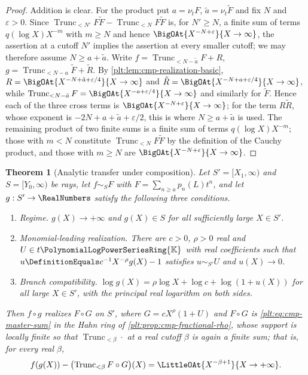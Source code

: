 \documentclass[11pt,oneside]{article}
\theoremstyle{plain}
\newtheorem{theorem}{Theorem}[section]
\theoremstyle{definition}
\theoremstyle{remark}
\newcommand{\K}{\mathbb{K}}
\newcommand{\PLpow}{\PolynomialLogPowerSeriesRing{\K}}   %
\newcommand{\ordt}{\nu_{t}}                              %
\newcommand{\Trunc}[2]{\operatorname{Trunc}_{<#2}#1}     %
\newcommand{\compose}{\mathbin{\circ}}
\begin{document}
\begin{proof}
Addition is clear.  For the product put \(a=\ordt F\),
\(\tilde a=\ordt\tilde F\) and fix \(N\) and \(\varepsilon>0\).
Since \(\Trunc{F\tilde F}{N'}-\Trunc{F\tilde F}{N}\) is, for \(N'\ge N\), a
finite sum of terms \(q(\log X)X^{-m}\) with \(m\ge N\) and hence
\(\BigOAt{X^{-N+\varepsilon}}{X\to\infty}\), the assertion at a cutoff \(N'\)
implies the assertion at every smaller cutoff; we may therefore assume
\(N\ge a+\tilde a\).  Write
\(f=\Trunc{F}{N-\tilde a}+R\), \(g=\Trunc{\tilde F}{N-a}+\tilde R\).  By
\cref{plt:lem:cmp-realization-basic},
\(R=\BigOAt{X^{-N+\tilde a+\varepsilon/4}}{X\to\infty}\) and
\(\tilde R=\BigOAt{X^{-N+a+\varepsilon/4}}{X\to\infty}\), while
\(\Trunc{F}{N-\tilde a}=\BigOAt{X^{-a+\varepsilon/4}}{X\to\infty}\) and
similarly for \(\tilde F\).  Hence each of the three cross terms is
\(\BigOAt{X^{-N+\varepsilon}}{X\to\infty}\); for the term \(R\tilde R\),
whose exponent is \(-2N+a+\tilde a+\varepsilon/2\), this is where
\(N\ge a+\tilde a\) is used.  The remaining product of two
finite sums is a finite sum of terms \(q(\log X)X^{-m}\); those with \(m<N\)
constitute \(\Trunc{F\tilde F}{N}\) by the definition of the Cauchy product,
and those with \(m\ge N\) are \(\BigOAt{X^{-N+\varepsilon}}{X\to\infty}\).
\end{proof}

\begin{theorem}[Analytic transfer under composition]
\label{plt:thm:cmp-analytic-transfer}
Let \(S'=[X_{1},\infty)\) and \(S=[Y_{0},\infty)\) be rays, let
\(f\sim_{S}F\) with \(F=\sum_{n\ge a}p_n(L)t^n\), and let
\(g:S'\to\RealNumbers\) satisfy the following three conditions.
\begin{enumerate}
\item[\textup{(A1)}] \emph{Regime.}  \(g(X)\to+\infty\) and
\(g(X)\in S\) for all sufficiently large \(X\in S'\).
\item[\textup{(A2)}] \emph{Monomial-leading realization.}  There are
\(c>0\), \(\rho>0\) real and \(U\in t\PLpow\) with real coefficients such
that \(u\DefinitionEquals c^{-1}X^{-\rho}g(X)-1\) satisfies
\(u\sim_{S'}U\) and \(u(X)\to0\).
\item[\textup{(A3)}] \emph{Branch compatibility.}
\(\log g(X)=\rho\log X+\log c+\log(1+u(X))\) for all large \(X\in S'\), with
the principal real logarithm on both sides.
\end{enumerate}
Then \(f\circ g\) realizes \(F\compose G\) on \(S'\), where
\(G=cX^{\rho}(1+U)\) and \(F\compose G\) is
\eqref{plt:eq:cmp-master-sum} in the Hahn ring of
\cref{plt:prop:cmp-fractional-rho}, whose support is locally finite so that
\(\Trunc{\cdot}{\beta}\) at a real cutoff \(\beta\) is again a finite sum;
that is, for every real \(\beta\),
\[
 f(g(X))-\bigl(\Trunc{F\compose G}{\beta}\bigr)(X)
 =\LittleOAt{X^{-\beta+1}}{X\to+\infty}.
\]
\end{theorem}
\end{document}
